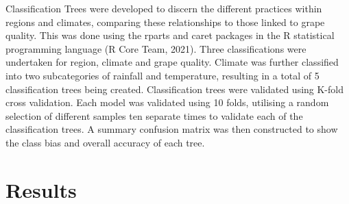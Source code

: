 \documentclass[review,12pt,authoryear]{elsarticle}
\begin{document}
\begin{linenumbers}
Classification Trees were developed to discern the different practices within regions and climates, 
comparing these relationships to those linked to grape quality. This was done using the rparts and caret packages \citep{kuhnBuildingPredictiveModels2008,terrytherneauRpartRecursivePartitioning2022} in the R statistical programming language (R Core Team, 2021). 
\newline
Three classifications were undertaken for region, climate and grape quality.
Climate was further classified into two subcategories of rainfall and temperature,
resulting in a total of 5 classification trees being created. %
Classification trees were validated using K-fold cross validation.%
 Each model was validated using 10 folds, utilising a random selection of different samples ten separate times to validate each of the  classification trees. A summary confusion matrix was then constructed to show the class bias and overall accuracy of each tree.



\section{Results}


\end{linenumbers}
\end{document}
